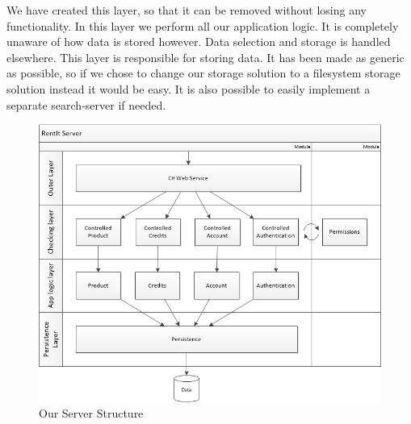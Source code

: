 We have created this layer, so that it can be removed without losing any functionality.
In this layer we perform all our application logic. It is completely unaware of how data is stored however. Data selection and storage is handled elsewhere.
This layer is responsible for storing data. It has been made as generic as possible, so if we chose to change our storage solution to a filesystem storage solution instead it would be easy. It is also possible to easily implement a separate search-server if needed.

\begin{figure}[H]
  \includegraphics[width=\textwidth]{illustrations/ServerStructure.png}
  \caption{Our Server Structure}
  \label{fig:serverstructure}
\end{figure}
\newpage